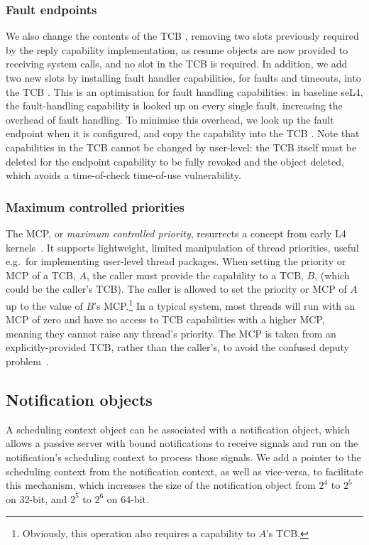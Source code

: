 \subsubsection{Fault endpoints}

We also change the contents of the TCB \cnode, removing two slots previously required by the reply
capability implementation, as resume objects are now provided to receiving system calls, and
no slot in the TCB \cnode is required. In addition, we add two new slots by installing fault handler
capabilities, for faults and timeouts, into the TCB \cnode. This is an optimisation for fault
handling capabilities: in baseline seL4, the fault-handling capability is looked up on every single fault, increasing the overhead of
fault handling. To minimise this overhead, we look up the fault endpoint when it is configured, and
copy the capability into the TCB \cnode.
Note that capabilities in the TCB \cnode cannot be changed
by user-level: the TCB itself must be deleted for the endpoint capability to be fully revoked and
the object deleted, which avoids a time-of-check time-of-use vulnerability.

\subsubsection{Maximum controlled priorities}

The MCP, or \emph{maximum controlled priority}, resurrects a concept from early L4
kernels~\citep{Liedtke_96:rm}. It supports lightweight, limited manipulation of thread priorities,
useful e.g.\ for implementing user-level thread packages. When setting
the priority or MCP of a TCB, \(A\),
the caller must provide the capability to a TCB, \(B\), (which could be the caller's
TCB). The caller is allowed to set the priority or MCP of \(A\) up to the value
of \(B\)'s MCP.\footnote{Obviously, this operation also requires a capability to \(A\)'s TCB.}
In a typical system, most threads
will run with an MCP of zero and have no access to TCB capabilities with a higher MCP, meaning they
cannot raise any thread's priority.
The MCP is taken from an explicitly-provided TCB, rather than the caller's, to avoid the
confused deputy problem~\citep{Hardy_88}.

\subsection{Notification objects}

A scheduling context object can be associated with a notification object, which allows a passive
server with bound notifications to receive signals and run on the notification's
scheduling context to process those signals.
We add a pointer to the scheduling context from the notification context, as well as vice-versa, to 
facilitate this mechanism, which increases the size of the notification object from $2^{4}$ to
$2^{5}$ on 32-bit, and $2^{5}$ to $2^{6}$ on 64-bit. 


